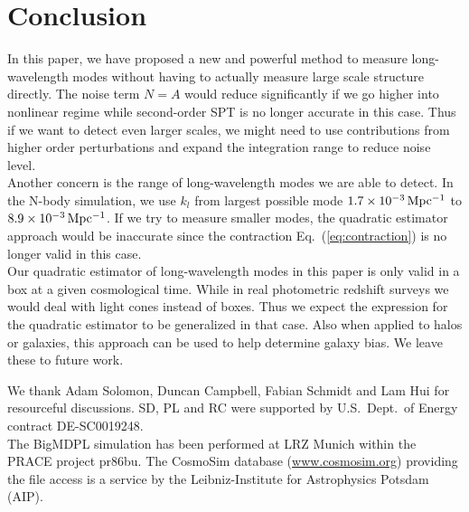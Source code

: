 \documentclass[prd,amsmath,amssymb,floatfix,superscriptaddress,nofootinbib,twocolumn]{revtex4-1}
\newcommand{\ec}[1]{Eq.~(\ref{eq:#1})}
\begin{document}
\section{Conclusion}\label{sec4}
In this paper, we have proposed a new and powerful method to measure long-wavelength modes without having to actually measure large scale structure directly. The noise term $N=A$ would reduce significantly if we go higher into nonlinear regime while second-order SPT is no longer accurate in this case. Thus if we want to detect even larger scales, we might need to use contributions from higher order perturbations and expand the integration range to reduce noise level. \\
Another concern is the range of long-wavelength modes we are able to detect. In the N-body simulation, we use $k_l$ from largest possible mode $1.7 \times 10^{-3} \, \rm Mpc^{-1}$ to $8.9\times 10^{-3} \, \rm Mpc^{-1}$. If we try to measure smaller modes, the quadratic estimator approach would be inaccurate since the contraction \ec{contraction} is no longer valid in this case.\\
Our quadratic estimator of long-wavelength modes in this paper is only valid in a box at a given cosmological time. While in real photometric redshift surveys we would deal with light cones instead of boxes. Thus we expect the expression for the quadratic estimator to be generalized in that case. Also when applied to halos or galaxies, this approach can be used to help determine galaxy bias. We leave these to future work.

\acknowledgements
\noindent We thank Adam Solomon, Duncan Campbell, Fabian Schmidt and Lam Hui for resourceful discussions.  SD, PL and RC were supported by U.S.\ Dept.\ of Energy contract DE-SC0019248.\\
The BigMDPL simulation has been performed at LRZ Munich within the PRACE project pr86bu. The CosmoSim database (\url{www.cosmosim.org}) providing the file access is a service by the Leibniz-Institute for Astrophysics Potsdam (AIP).
%

\end{document}
